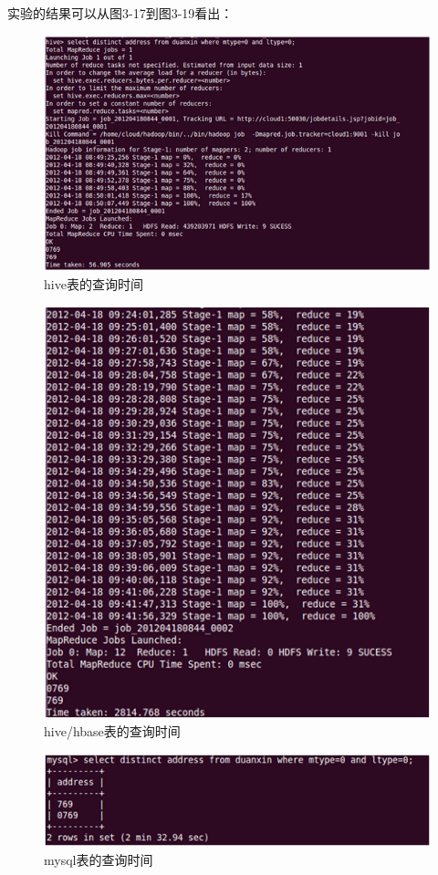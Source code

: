 实验的结果可以从图3-17到图3-19看出：
\begin{description}

\item
\begin{figure}[!ht]
\centering
\includegraphics[scale=0.8]{photo/djh5.png}
\caption{hive表的查询时间}
\end{figure} 

\item
\begin{figure}[!ht]
\centering
\includegraphics[scale=0.7]{photo/djh6.png}
\caption{hive/hbase表的查询时间}
\end{figure} 

\item
\begin{figure}[!ht]
\centering
\includegraphics[]{photo/djm5.png} 
\caption{mysql表的查询时间}
\end{figure} 

\end{description}
